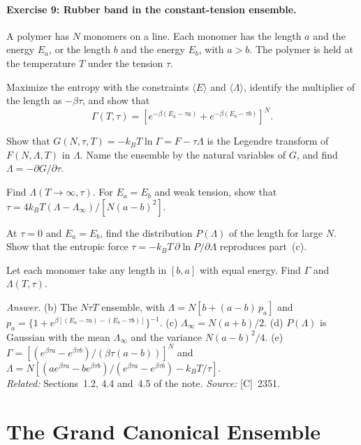 \documentclass[11pt]{article}      %
\numberwithin{equation}{section}   %
\begin{document}
\paragraph{Exercise 9: Rubber band in the constant-tension ensemble.}
A polymer has $N$ monomers on a line. Each monomer has the length $a$ and the energy $E_a$, or the length $b$ and the energy $E_b$, with $a > b$. The polymer is held at the temperature $T$ under the tension $\tau$.
\begin{parts}
    \item Maximize the entropy with the constraints $\langle E\rangle$ and $\langle\Lambda\rangle$, identify the multiplier of the length as $-\beta\tau$, and show that
    \begin{equation*}
        \Gamma(T, \tau) = \left[e^{-\beta(E_a - \tau a)} + e^{-\beta(E_b - \tau b)}\right]^N.
    \end{equation*}
    \item Show that $G(N, \tau, T) = -k_BT\ln\Gamma = F - \tau\Lambda$ is the Legendre transform of $F(N, \Lambda, T)$ in $\Lambda$. Name the ensemble by the natural variables of $G$, and find $\Lambda = -\partial G/\partial\tau$.
    \item Find $\Lambda(T \to \infty, \tau)$. For $E_a = E_b$ and weak tension, show that $\tau = 4k_BT(\Lambda - \Lambda_\infty)/[N(a - b)^2]$.
    \item At $\tau = 0$ and $E_a = E_b$, find the distribution $P(\Lambda)$ of the length for large $N$. Show that the entropic force $\tau = -k_BT\,\partial\ln P/\partial\Lambda$ reproduces part~(c).
    \item Let each monomer take any length in $[b, a]$ with equal energy. Find $\Gamma$ and $\Lambda(T, \tau)$.
\end{parts}
\textit{Answer.} (b) The $N\tau T$ ensemble, with $\Lambda = N\left[b + (a - b)\,p_a\right]$ and $p_a = \{1 + e^{\beta[(E_a - \tau a) - (E_b - \tau b)]}\}^{-1}$. (c) $\Lambda_\infty = N(a + b)/2$. (d) $P(\Lambda)$ is Gaussian with the mean $\Lambda_\infty$ and the variance $N(a - b)^2/4$. (e) $\Gamma = \left[(e^{\beta\tau a} - e^{\beta\tau b})/(\beta\tau(a - b))\right]^N$ and $\Lambda = N\left[(a e^{\beta\tau a} - b e^{\beta\tau b})/(e^{\beta\tau a} - e^{\beta\tau b}) - k_BT/\tau\right]$.\\
\textit{Related:} Sections~1.2, 4.4 and~4.5 of the note. \textit{Source:} [C]~2351.

\section{The Grand Canonical Ensemble}
\end{document}
